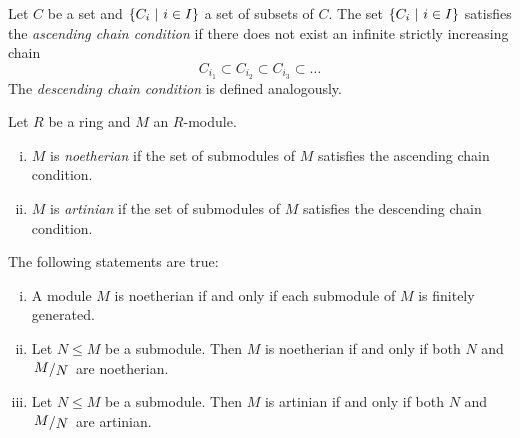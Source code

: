 \begin{definicija}
Let $C$ be a set and $\left\{C_i~\middle\vert~i \in I\right\}$ a set of subsets of $C$.
The set $\left\{C_i~\middle\vert~i \in I\right\}$ satisfies the
\emph{ascending chain condition}
if there does not exist an infinite strictly increasing chain
\[
C_{i_1} \subset C_{i_2} \subset C_{i_3} \subset \dots
\]
The
\emph{descending chain condition}
is defined analogously.
\end{definicija}

\begin{definicija}
Let $R$ be a ring and $M$ an $R$-module.

\begin{enumerate}[i)]
\item $M$ is \emph{noetherian} if the set
of submodules of $M$ satisfies the ascending chain condition.
\item $M$ is \emph{artinian} if the set of
submodules of $M$ satisfies the descending chain condition.
\end{enumerate}
\end{definicija}

\begin{trditev}
The following statements are true:

\begin{enumerate}[i)]
\item A module $M$ is noetherian if and only if each submodule of
$M$ is finitely generated.
\item Let $N \leq M$ be a submodule. Then $M$ is noetherian if and
only if both $N$ and $\kvoc{M}{N}$ are noetherian.
\label{fin_wed:prop:noet}
\item Let $N \leq M$ be a submodule. Then $M$ is artinian if and
only if both $N$ and $\kvoc{M}{N}$ are artinian.
\end{enumerate}
\end{trditev}

